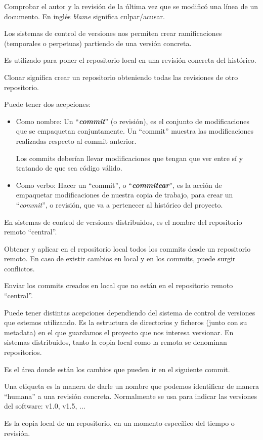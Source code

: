 \begin{description}[style=nextline]
    \item[Blame] Comprobar el autor y la revisión de la última vez que se modificó una línea de un documento. En inglés \textit{blame} significa culpar/acusar.
    \item[Branch] Los sistemas de control de versiones nos permiten crear ramificaciones (temporales o perpetuas) partiendo de una versión concreta.
    \item[Checkout] Es utilizado para poner el repositorio local en una revisión concreta del histórico.
    \item[Clone] Clonar significa crear un repositorio obteniendo todas las revisiones de otro repositorio.
    \item[Commit] Puede tener dos acepciones:
    \begin{itemize}
        \item Como nombre: Un “\textbf{\textit{commit}}” (o revisión), es el conjunto de modificaciones que se empaquetan conjuntamente. Un “commit” muestra las modificaciones realizadas respecto al commit anterior.

        Los commits deberían llevar modificaciones que tengan que ver entre sí y tratando de que sea código válido.
        \item Como verbo: Hacer un “commit”, o “\textit{\textbf{commitear}}”, es la acción de empaquetar modificaciones de nuestra copia de trabajo, para crear un “\textit{commit}”, o revisión, que va a pertenecer al histórico del proyecto.
    \end{itemize}
    \item[Origin] En sistemas de control de versiones distribuidos, es el nombre del repositorio remoto “central”.

    \item[Pull] Obtener y aplicar en el repositorio local todos los commits desde un repositorio remoto. En caso de existir cambios en local y en los commits, puede surgir conflictos.

    \item[Push] Enviar los commits creados en local que no están en el repositorio remoto “central”.
    \item[Repository] Puede tener distintas acepciones dependiendo del sistema de control de versiones que estemos utilizando. Es la estructura de directorios y ficheros (junto con su metadata) en el que guardamos el proyecto que nos interesa versionar. En sistemas distribuidos, tanto la copia local como la remota se denominan repositorios.

    \item[Stage Area] Es el área donde están los cambios que pueden ir en el siguiente commit.

    \item[Tag] Una etiqueta es la manera de darle un nombre que podemos identificar de manera “humana” a una revisión concreta. Normalmente se usa para indicar las versiones del software: v1.0, v1.5, ...
    \item[Working copy] Es la copia local de un repositorio, en un momento específico del tiempo o revisión.
\end{description}